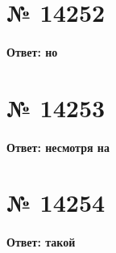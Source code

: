 \documentclass[11pt]{article} %
\begin{document}
\section{№ \textbf{14252}}

\paragraph{Ответ: \textbf{но}}

\section{№ \textbf{14253}}

\paragraph{Ответ: \textbf{несмотря на}}

\section{№ \textbf{14254}}

\paragraph{Ответ: \textbf{такой}}
\end{document}
